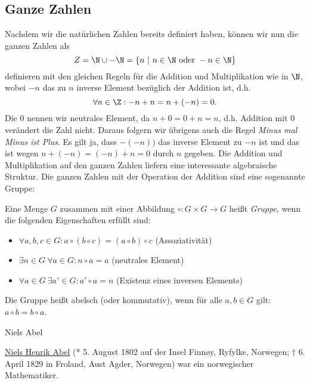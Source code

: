 \documentclass[letterpaper,10pt,english]{jupyterBook}
\begin{document}
\subsection{Ganze Zahlen}
\label{\detokenize{grundlagen/zahlensysteme:ganze-zahlen}}
Nachdem wir die natürlichen Zahlen bereits definiert haben, können wir nun die ganzen Zahlen als
\begin{equation*}
 Z = \N \cup -\N = \{n ~|~n \in \N \text{ oder } -n \in \N \}
\end{equation*}
definieren mit den gleichen Regeln für die Addition und Multiplikation wie in \(\N\), wobei \(-n\) das zu \(n\) inverse Element bezüglich der Addition ist, d.h.
\begin{equation*}
\forall n \in \Z: -n + n = n + (-n) = 0.
\end{equation*}
Die \(0\) nennen wir neutrales Element, da \(n+0=0+n=n\), d.h. Addition mit \(0\) verändert die Zahl nicht.
Daraus folgern wir übrigens auch die Regel \emph{Minus mal Minus ist Plus}. Es gilt ja, dass \(-(-n))\) das inverse Element zu \(-n\) ist und das ist wegen \(n+(-n) = (-n)+n=0\) durch \(n\) gegeben.
Die Addition und Multiplikation auf den ganzen Zahlen liefern eine interessante algebraische Struktur.
Die ganzen Zahlen mit der Operation der Addition sind eine sogenannte Gruppe:
\label{grundlagen/zahlensysteme:definition-4}
\begin{definition}{}{}



Eine Menge \(G\) zusammen mit einer Abbildung \(\circ: G \times G \rightarrow G\) heißt \emph{Gruppe}, wenn die folgenden Eigenschaften erfüllt sind:
\begin{itemize}
\item {} 
\( \forall a,b,c \in G: a \circ (b \circ c) = (a\circ b) \circ c\) (Assoziativität)

\item {} 
\(\exists n \in G~ \forall a \in G: n \circ a = a\) (neutrales Element)

\item {} 
\(\forall a \in G~\exists a' \in G: a' \circ a = n\) (Existenz eines inversen Elements)

\end{itemize}

Die Gruppe heißt abelsch (oder kommutativ), wenn für alle \(a,b \in G\) gilt: \(a \circ b = b \circ a\).
\end{definition}

\begin{emphBox}{Niels Abel}{}

\href{https://de.wikipedia.org/wiki/Niels\_Henrik\_Abel}{Niels Henrik Abel} (* 5. August 1802 auf der Insel Finnøy, Ryfylke, Norwegen; † 6. April 1829 in Froland, Aust Agder, Norwegen) war ein norwegischer Mathematiker.
\end{emphBox}
\end{document}
